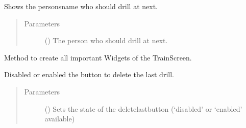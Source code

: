 \documentclass[letterpaper,10pt,english]{sphinxmanual}
\begin{document}
\begin{fulllineitems}
\begin{fulllineitems}
\label{\detokenize{anoog.automation:anoog.automation.graphical_user_interface.Train_Window.change_train_person}}
\sphinxAtStartPar
Shows the persons\sphinxhyphen{}name who should drill at next.
\begin{quote}\begin{description}
\item[{Parameters}] \leavevmode
\sphinxAtStartPar
{} () \textendash{} The person who should drill at next.

\end{description}\end{quote}

\end{fulllineitems}


\begin{fulllineitems}
\label{\detokenize{anoog.automation:anoog.automation.graphical_user_interface.Train_Window.create_widgets}}
\sphinxAtStartPar
Method to create all important Widgets of the Train\sphinxhyphen{}Screen.

\end{fulllineitems}


\begin{fulllineitems}
\label{\detokenize{anoog.automation:anoog.automation.graphical_user_interface.Train_Window.delete_last_btn_change}}
\sphinxAtStartPar
Disabled or enabled the button to delete the last drill.
\begin{quote}\begin{description}
\item[{Parameters}] \leavevmode
\sphinxAtStartPar
{} () \textendash{} Sets the state of the delete\sphinxhyphen{}last\sphinxhyphen{}button (‘disabled’ or ‘enabled’ available)


\end{description}
\end{quote}
\end{fulllineitems}
\end{fulllineitems}
\end{document}

